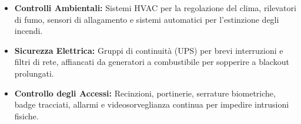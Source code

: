 \begin{defbox}
\begin{itemize}
    \item \textbf{Controlli Ambientali:} Sistemi HVAC per la regolazione del clima, rilevatori di fumo, sensori di allagamento e sistemi automatici per l'estinzione degli incendi.
    \item \textbf{Sicurezza Elettrica:} Gruppi di continuità (UPS) per brevi interruzioni e filtri di rete, affiancati da generatori a combustibile per sopperire a blackout prolungati.
    \item \textbf{Controllo degli Accessi:} Recinzioni, portinerie, serrature biometriche, badge tracciati, allarmi e videosorveglianza continua per impedire intrusioni fisiche.
\end{itemize}
\end{defbox}